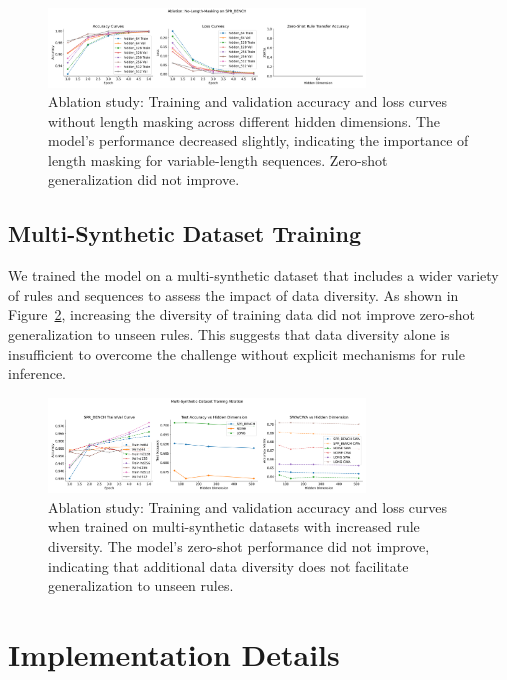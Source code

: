 \documentclass{article} %
\theoremstyle{plain}
\begin{document}
\begin{figure}[h!]
\centering
\includegraphics[width=0.75\textwidth]{Ablation_NoLengthMasking.png}
\caption{Ablation study: Training and validation accuracy and loss curves without length masking across different hidden dimensions. The model's performance decreased slightly, indicating the importance of length masking for variable-length sequences. Zero-shot generalization did not improve.}
\label{fig:ablation_no_length_masking}
\end{figure}

\subsection{Multi-Synthetic Dataset Training}

We trained the model on a multi-synthetic dataset that includes a wider variety of rules and sequences to assess the impact of data diversity. As shown in Figure~\ref{fig:ablation_multisynthetic}, increasing the diversity of training data did not improve zero-shot generalization to unseen rules. This suggests that data diversity alone is insufficient to overcome the challenge without explicit mechanisms for rule inference.

\begin{figure}[h!]
\centering
\includegraphics[width=0.75\textwidth]{Ablation_MultiSynthetic_Dataset.png}
\caption{Ablation study: Training and validation accuracy and loss curves when trained on multi-synthetic datasets with increased rule diversity. The model's zero-shot performance did not improve, indicating that additional data diversity does not facilitate generalization to unseen rules.}
\label{fig:ablation_multisynthetic}
\end{figure}

\section{Implementation Details}
\label{sec:implementation_details}
\end{document}
